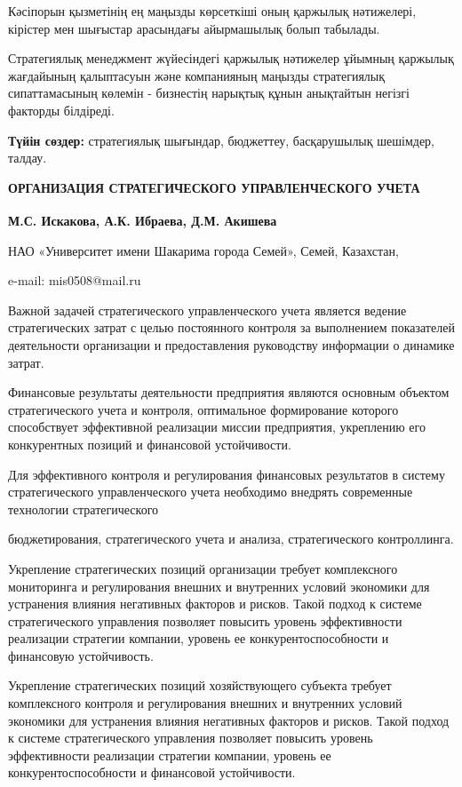 Кәсіпорын қызметінің ең маңызды көрсеткіші оның қаржылық нәтижелері,
кірістер мен шығыстар арасындағы айырмашылық болып табылады.

Стратегиялық менеджмент жүйесіндегі қаржылық нәтижелер ұйымның қаржылық
жағдайының қалыптасуын және компанияның маңызды стратегиялық
сипаттамасының көлемін - бизнестің нарықтық құнын анықтайтын негізгі
факторды білдіреді.

{\bfseries Түйін сөздер:} стратегиялық шығындар, бюджеттеу, басқарушылық
шешімдер, талдау.

\begin{articleheader}
{\bfseries ОРГАНИЗАЦИЯ СТРАТЕГИЧЕСКОГО УПРАВЛЕНЧЕСКОГО УЧЕТА}

{\bfseries
М.С. Искакова\textsuperscript{\envelope },
А.К. Ибраева,
Д.М. Акишева
}
\end{articleheader}

\begin{articleheader}
НАО «Университет имени Шакарима города Семей», Семей, Казахстан,

e-mail: mis0508@mail.ru
\end{articleheader}

\vspace{-1em}
Важной задачей стратегического управленческого учета является ведение
стратегических затрат с целью постоянного контроля за выполнением
показателей деятельности организации и предоставления руководству
информации о динамике затрат.

Финансовые результаты деятельности предприятия являются основным
объектом стратегического учета и контроля, оптимальное формирование
которого способствует эффективной реализации миссии предприятия,
укреплению его конкурентных позиций и финансовой устойчивости.

Для эффективного контроля и регулирования финансовых результатов в
систему стратегического управленческого учета необходимо внедрять
современные технологии стратегического 

бюджетирования, стратегического
учета и анализа, стратегического контроллинга.

Укрепление стратегических позиций организации требует комплексного
мониторинга и регулирования внешних и внутренних условий экономики для
устранения влияния негативных факторов и рисков. Такой подход к системе
стратегического управления позволяет повысить уровень эффективности
реализации стратегии компании, уровень ее конкурентоспособности и
финансовую устойчивость.

Укрепление стратегических позиций хозяйствующего субъекта требует
комплексного контроля и регулирования внешних и внутренних условий
экономики для устранения влияния негативных факторов и рисков. Такой
подход к системе стратегического управления позволяет повысить уровень
эффективности реализации стратегии компании, уровень ее
конкурентоспособности и финансовой устойчивости.

